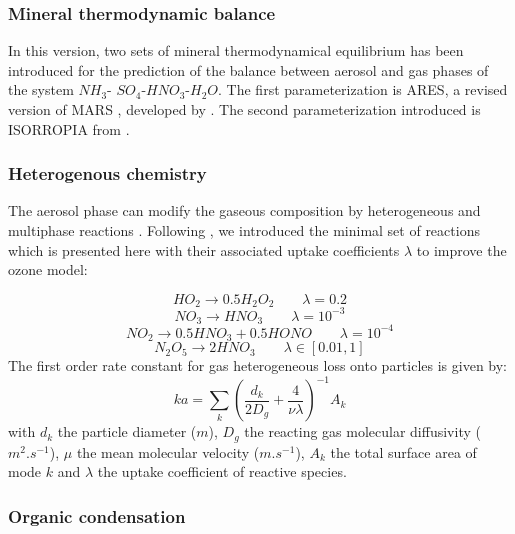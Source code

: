 \subsubsection*{Mineral thermodynamic balance}
In this version, two sets of mineral thermodynamical equilibrium has been 
introduced for 
the prediction of the balance between aerosol and gas phases of the  system $NH_3$-
$SO_4$-$HNO_3$-$H_2O$.
The first parameterization is ARES, a revised version of MARS \citep{Saxena1986}, 
developed by \citet{Binkowski1995}.
The second parameterization introduced is ISORROPIA from \citet{Nenes1998}. 

\subsubsection*{Heterogenous chemistry}
The aerosol phase can modify the gaseous composition by heterogeneous and 
multiphase reactions
\citep{Ravi1997}. Following \citet{Jacob2000}, we introduced the 
minimal set of reactions which is presented here with their associated uptake 
coefficients $\lambda$ to improve the  ozone model:

\begin{equation}
HO_2 \rightarrow 0.5 H_2O_2 \qquad   \lambda = 0.2 
\label{hetero1}
\end{equation}
\begin{equation}
NO_3 \rightarrow HNO_3   \qquad   \lambda = 10^{-3} 
\label{hetero2}
\end{equation}
\begin{equation}
NO_2 \rightarrow 0.5 HNO_3 + 0.5 HONO  \qquad    \lambda = 10^{-4}  
\label{hetero3}
\end{equation}
\begin{equation}
N_2O_5 \rightarrow 2 HNO_3 \qquad    \lambda \in [0.01,1] 
\label{hetero4}
\end{equation}
The first order rate constant for gas heterogeneous loss onto particles is given 
by:\\
\begin{equation}
ka = \sum_{k}\left(\frac{d_k}{2D_g} +  \frac{4}{\nu \lambda} \right)^{-1} A_k
\label{ka}
\end{equation}
with $d_k$ the particle diameter ($m$), $D_g$ the reacting gas molecular 
diffusivity ($m^2.s^{-1}$), $\mu$ 
the mean molecular velocity ($m.s^{-1}$), $A_k$ the total surface area of mode 
$k$ and $\lambda$ the uptake coefficient of reactive species.

\subsubsection*{Organic condensation}

